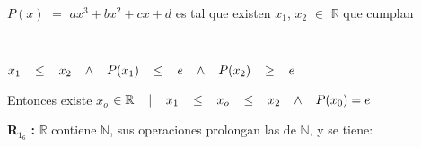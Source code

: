 \documentclass[12pt]{article}
\begin{document}
\begin{center}
    $P(x)$ $=$ $ax^{3} + bx^{2} + cx + d$ \hspace{0.1cm} es tal que existen \hspace{0.1cm} $x_1$, $x_2$ $\in$ $\mathbb{R}$ \hspace{0.1cm} que cumplan
\end{center}\\
\begin{center}
    $x_1\hspace{0.3 cm} \leq \hspace{0.3 cm} x_2 \hspace{0.3 cm} \wedge \hspace{0.3 cm} P(x_1) \hspace{0.3 cm} \leq \hspace{0.3 cm} e \hspace{0.3 cm} \wedge \hspace{0.3 cm} P(x_2) \hspace{0.3 cm} \geq \hspace{0.3 cm} e$
\end{center}
\begin{center}
   Entonces existe $x_o$ $\in \mathbb{R} \hspace{0.3 cm} \mid \hspace{0.3 cm} x_1 \hspace{0.3 cm} \leq \hspace{0.3 cm} x_o \hspace{0.3 cm} \leq \hspace{0.3 cm} x_2 \hspace{0.3 cm} \wedge \hspace{0.3 cm} P(x_0) = e $
\end{center}

\newpage

\textbf{R}$_1_6$ \hspace{0.1cm}\textbf{:} $\mathbb{R}$ contiene $\mathbb{N}$, sus operaciones prolongan las de $\mathbb{N}$, y se tiene: \\
\end{document}
